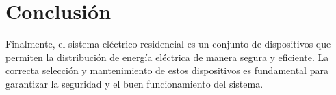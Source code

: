 \documentclass[conference]{IEEEtran}
\theoremstyle{mytheoremstyle}
\theoremstyle{mytheoremstyle}
\theoremstyle{myproblemstyle}
\begin{document}
        \section{Conclusión}
        Finalmente, el sistema eléctrico residencial es un conjunto de dispositivos que permiten la distribución de energía eléctrica de manera segura y eficiente. La correcta selección y mantenimiento de estos dispositivos es fundamental para garantizar la seguridad y el buen funcionamiento del sistema.

    
\end{document}
